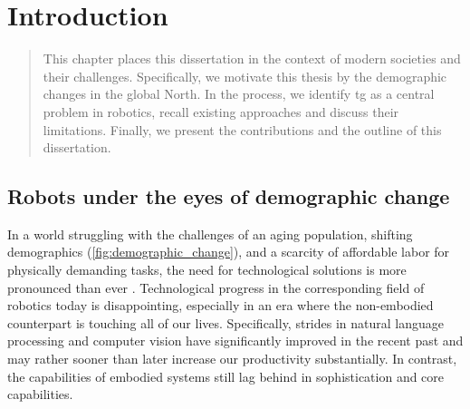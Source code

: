 \chapter{Introduction} %
\label{cha:intro}


\begin{abstract}
This chapter places this dissertation in the context of
modern societies and their challenges. Specifically, we
motivate this thesis by the demographic changes in the
global North. In the process, we identify
\acl{tg} as a central problem in robotics, recall existing
approaches and discuss their limitations. Finally, we
present the contributions and the outline of this
dissertation.
\end{abstract}

\newpage


\section{Robots under the eyes of demographic change}

In a world struggling with the challenges of an aging
population, shifting demographics
(\cref{fig:demographic_change}), and a scarcity of
affordable labor for physically demanding tasks, the need
for technological solutions is more pronounced than ever
\cite{ince2015economic}. Technological progress in the
corresponding field of robotics today is disappointing,
especially in an era where the non-embodied counterpart is
touching all of our lives. Specifically, strides in natural
language processing and computer vision have significantly
improved in the recent past and may rather sooner than later
increase our productivity substantially. In contrast, the
capabilities of embodied systems still lag behind in
sophistication and core capabilities.

